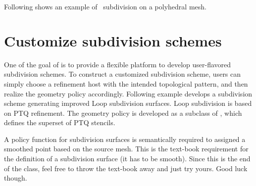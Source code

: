 Following shows an example of \DS\ subdivision on a polyhedral mesh.

\section{Customize subdivision schemes}
One of the goal of  is 
to provide a flexible platform
to develop user-flavored subdivision schemes.
To construct a customized subdivision scheme, users can simply 
choose a refinement host with the intended topological pattern, 
and then realize the geometry policy accordingly. 
Following example develops a subdivision scheme
generating improved Loop subdivision surfaces. Loop subdivision is
based on PTQ refinement. The geometry policy is developed as a subclass 
of , which defines the superset of PTQ stencils.


A policy function for subdivision surfaces is semantically
required to assigned a smoothed point based on the source mesh.
This is the text-book requirement for the definition of a
subdivision surface (it has to be smooth). Since this is the end of the
class, feel free to throw the text-book away and just try yours. 
Good luck though.

